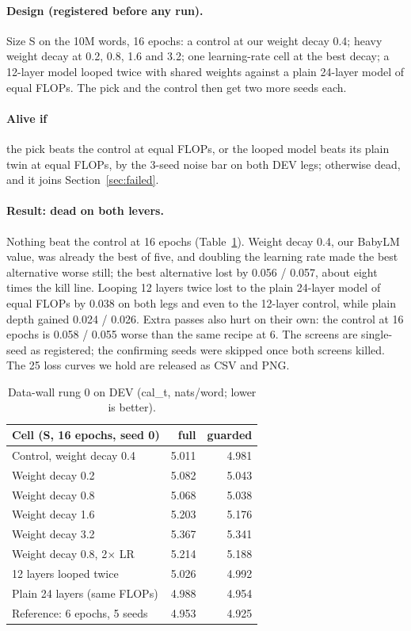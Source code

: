 \documentclass[11pt]{article}
\begin{document}
\paragraph{Design (registered before any run).} Size S on the 10M words, 16 epochs: a control at our weight decay 0.4;
heavy weight decay at 0.2, 0.8, 1.6 and 3.2; one learning-rate cell at the best decay; a 12-layer model looped twice
with shared weights \citep{chen2026looped,parcae2026,ouro2025} against a plain 24-layer model of equal FLOPs. The pick
and the control then get two more seeds each.

\paragraph{Alive if} the pick beats the control at equal FLOPs, or the looped model beats its plain twin at equal FLOPs,
by the 3-seed noise bar on both DEV legs; otherwise dead, and it joins Section~\ref{sec:failed}.

\paragraph{Result: dead on both levers.} Nothing beat the control at 16 epochs (Table~\ref{tab:rung0}). Weight decay
0.4, our BabyLM value, was already the best of five, and doubling the learning rate made the best alternative worse
still; the best alternative lost by 0.056 / 0.057, about eight times the kill line. Looping 12 layers twice lost to the
plain 24-layer model of equal FLOPs by 0.038 on both legs and even to the 12-layer control, while plain depth gained
0.024 / 0.026. Extra passes also hurt on their own: the control at 16 epochs is 0.058 / 0.055 worse than the same
recipe at 6. The screens are single-seed as registered; the confirming seeds were skipped once both screens killed.
The 25 loss curves we hold are released as CSV and PNG.

\begin{table}[t]
\centering
\small
\begin{tabular}{@{}lrr@{}}
\toprule
Cell (S, 16 epochs, seed 0) & full & guarded \\
\midrule
Control, weight decay 0.4 & 5.011 & 4.981 \\
Weight decay 0.2 & 5.082 & 5.043 \\
Weight decay 0.8 & 5.068 & 5.038 \\
Weight decay 1.6 & 5.203 & 5.176 \\
Weight decay 3.2 & 5.367 & 5.341 \\
Weight decay 0.8, 2$\times$ LR & 5.214 & 5.188 \\
12 layers looped twice & 5.026 & 4.992 \\
Plain 24 layers (same FLOPs) & 4.988 & 4.954 \\
\midrule
Reference: 6 epochs, 5 seeds & 4.953 & 4.925 \\
\bottomrule
\end{tabular}
\caption{Data-wall rung 0 on DEV (cal\_t, nats/word; lower is better).}
\label{tab:rung0}
\end{table}
\end{document}
